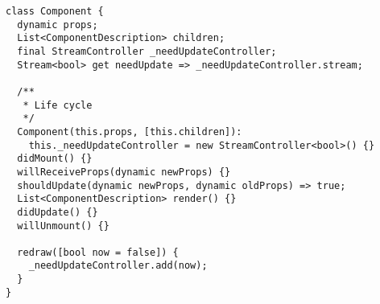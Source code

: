 \begin{verbatim}
class Component {
  dynamic props;
  List<ComponentDescription> children;
  final StreamController _needUpdateController;
  Stream<bool> get needUpdate => _needUpdateController.stream; 

  /**
   * Life cycle
   */
  Component(this.props, [this.children]): 
    this._needUpdateController = new StreamController<bool>() {}
  didMount() {}
  willReceiveProps(dynamic newProps) {}
  shouldUpdate(dynamic newProps, dynamic oldProps) => true;
  List<ComponentDescription> render() {}
  didUpdate() {}
  willUnmount() {}
  
  redraw([bool now = false]) {
    _needUpdateController.add(now);
  }
}
\end{verbatim}

\iffalse
\begin{verbatim}
class Component {
  
  /**
   * props of component
   */
  dynamic props;
  
  List<ComponentDescription> children;

  /**
   * stream controller used to signalize to node, 
   * when component need to be udpated
   */
  final StreamController _needUpdateController;

  /**
   * Offer stream which will create event everytime, when it need to be updated (rendered).
   * 
   * Stream use boolean data, which tells, if update should be done immediately
   */
  Stream<bool> get needUpdate => _needUpdateController.stream; 

  /**
   * constructor, it create component with setted stream controller. 
   * 
   * If stream was not passed, it will create own stream controller
   */
  Component(this.props, [this.children]): 
    this._needUpdateController = new StreamController<bool>() {}
  
  didMount() {}

  willReceiveProps(dynamic newProps) {}
  
  shouldUpdate(dynamic newProps, dynamic oldProps) => true;
  
  List<ComponentDescription> render() {}
  
  didUpdate() {}
  
  willUnmount() {}
  
  /**
   * redraw will add event to stream
   */
  redraw([bool now = false]) {
    _needUpdateController.add(now);
  }
}
\end{verbatim}
\fi
